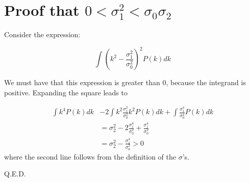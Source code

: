 \documentclass[12pt]{article}
\begin{document}
\section{Proof that $0 < \sigma_1^2 < \sigma_0\sigma_2$} \label{Proof}

Consider the expression:

\begin{equation}
\int (k^2 - \frac{\sigma_1^2}{\sigma_0^2})^2 P(k) dk
\end{equation}

\noindent We must have that this expression is greater than 0, because the integrand is positive. Expanding the square leads to

\begin{equation}
\begin{split}
\int k^4 P(k) dk &- 2 \int k^2 \frac{\sigma_1^2}{\sigma_0^2}k^2 P(k) dk + \int \frac{\sigma_1^4}{\sigma_0^4} P(k) dk \\
&= \sigma_2^2 - 2 \frac{\sigma_1^4}{\sigma_0^2} + \frac{\sigma_1^4}{\sigma_0^2} \\
&= \sigma_2^2 - \frac{\sigma_1^4}{\sigma_0^2} > 0
\end{split}
\end{equation}
where the second line follows from the definition of the $\sigma$'s.

Q.E.D.
\end{document}
